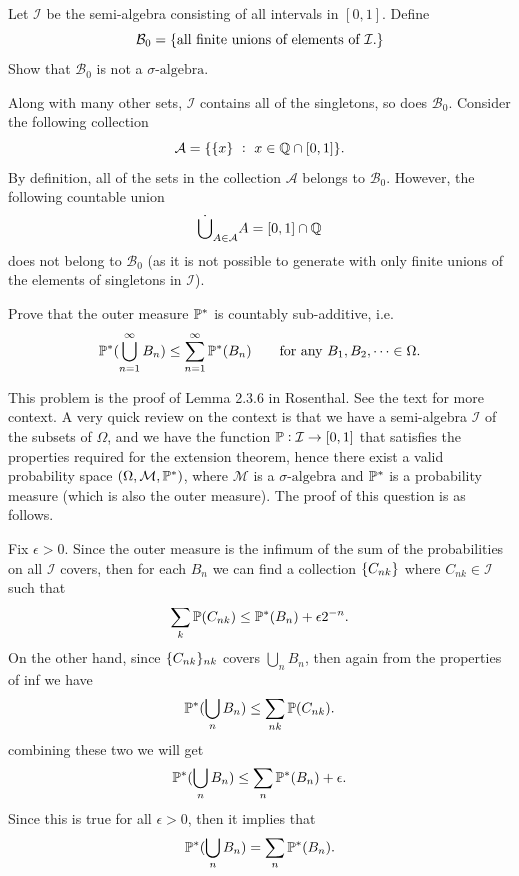 \begin{problem}
	Let $ \mathcal{I} $ be the semi-algebra consisting of all intervals in $ [0,1] $. Define
	\[ \mathcal{B}_0 = \{\text{all finite unions of elements of $ \mathcal{I} $}.\} \]
	Show that $ \mathcal{B}_0 $ is not a $ \sigma\text{-algebra} $.
\end{problem}
\begin{solution}
	Along with many other sets, $ \mathcal{I} $ contains all of the singletons, so does $ \mathcal{B}_0 $. Consider the following collection
	\[ \mathcal{A} = \{\{x\}\ :\ x \in \mathbb{Q} \cap [0,1]\}. \]
	By definition, all of the sets in the collection $ \mathcal{A} $ belongs to $ \mathcal{B}_0 $. However, the following countable union
	\[ \dot\bigcup_{A \in \mathcal{A}} A = [0,1] \cap \mathbb{Q} \]
	does not belong to $ \mathcal{B}_0 $ (as it is not possible to generate with only finite unions of the elements of singletons in $ \mathcal{I} $).
\end{solution}

\begin{problem}
	Prove that the outer measure $ \mathbb{P}^* $ is countably sub-additive, i.e.
	\[ \mathbb{P}^*(\bigcup_{n=1}^{\infty} B_n) \leq \sum_{n=1}^{\infty} \mathbb{P}^*(B_n) \qquad \text{for any $ B_1,B_2,\cdots \in \Omega $}.\]
\end{problem}
\begin{solution}
	This problem is the proof of Lemma 2.3.6 in Rosenthal. See the text for more context. A very quick review on the context is that we have a semi-algebra $ \mathcal{I} $ of the subsets of $ \Omega $, and we have the function $ \mathbb{P}: \mathcal{I} \to [0,1] $ that satisfies the properties required for the extension theorem, hence there exist a valid probability space $ (\Omega, \mathcal{M}, \mathbb{P}^*) $, where $ \mathcal{M} $ is a $ \sigma\text{-algebra} $ and $ \mathbb{P}^* $ is a probability measure (which is also the outer measure). The proof of this question is as follows. 
	
	Fix $ \epsilon>0 $. Since the outer measure is the infimum of the sum of the probabilities on all $ \mathcal{I} $ covers, then for each $ B_n $ we can find a collection $ \{C_{nk}\} $ where $ C_{nk}\in\mathcal{I} $ such that 
	\[ \sum_k \mathbb{P}(C_{nk}) \leq \mathbb{P}^*(B_n) + \epsilon2^{-n}. \]
	On the other hand, since $ \{C_{nk}\}_{nk} $ covers $ \bigcup_n B_n $, then again from the properties of inf we have
	\[ \mathbb{P}^*(\bigcup_n B_n) \leq \sum_{nk} \mathbb{P}(C_{nk}). \]
	combining these two we will get
	\[  \mathbb{P}^*(\bigcup_n B_n) \leq \sum_n \mathbb{P}^*(B_n) + \epsilon. \]
	Since this is true for all $ \epsilon>0 $, then it implies that 
	\[  \mathbb{P}^*(\bigcup_n B_n) = \sum_n \mathbb{P}^*(B_n). \]
\end{solution}

